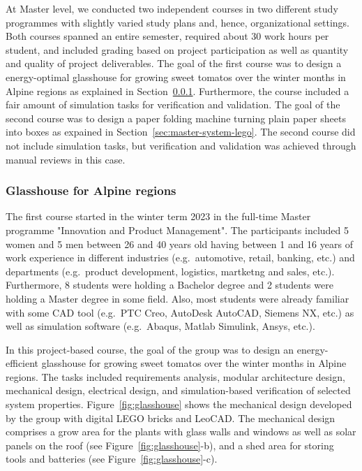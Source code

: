 \documentclass{PDS}
\begin{document}
At Master level, we conducted two independent courses in two different study programmes with slightly varied study plans and, hence, organizational settings.
Both courses spanned an entire semester, required about 30 work hours per student, and included grading based on project participation as well as quantity and quality of project deliverables.
The goal of the first course was to design a energy-optimal glasshouse for growing sweet tomatos over the winter months in Alpine regions as explained in Section~\ref{sec:master-product-lego}.
Furthermore, the course included a fair amount of simulation tasks for verification and validation.
The goal of the second course was to design a paper folding machine turning plain paper sheets into boxes as expained in Section~\ref{sec:master-system-lego}.
The second course did not include simulation tasks, but verification and validation was achieved through manual reviews in this case.

\subsubsection{Glasshouse for Alpine regions}
\label{sec:master-product-lego}

The first course started in the winter term 2023 in the full-time Master programme "Innovation and Product Management".
The participants included 5 women and 5 men between 26 and 40 years old having between 1 and 16 years of work experience in different industries (e.g.\ automotive, retail, banking, etc.) and departments (e.g.\ product development, logistics, martketng and sales, etc.).
Furthermore, 8 students were holding a Bachelor degree and 2 students were holding a Master degree in some field.
Also, most students were already familiar with some CAD tool (e.g.\ PTC Creo, AutoDesk AutoCAD, Siemens NX, etc.) as well as simulation software (e.g.\ Abaqus, Matlab Simulink, Ansys, etc.).

In this project-based course, the goal of the group was to design an energy-efficient glasshouse for growing sweet tomatos over the winter months in Alpine regions.
The tasks included requirements analysis, modular architecture design, mechanical design, electrical design, and simulation-based verification of selected system properties.
Figure~\ref{fig:glasshouse} shows the mechanical design developed by the group with digital LEGO bricks and LeoCAD.
The mechanical design comprises a grow area for the plants with glass walls and windows as well as solar panels on the roof (see Figure~\ref{fig:glasshouse}-b), and a shed area for storing tools and batteries (see Figure~\ref{fig:glasshouse}-c).
\end{document}
